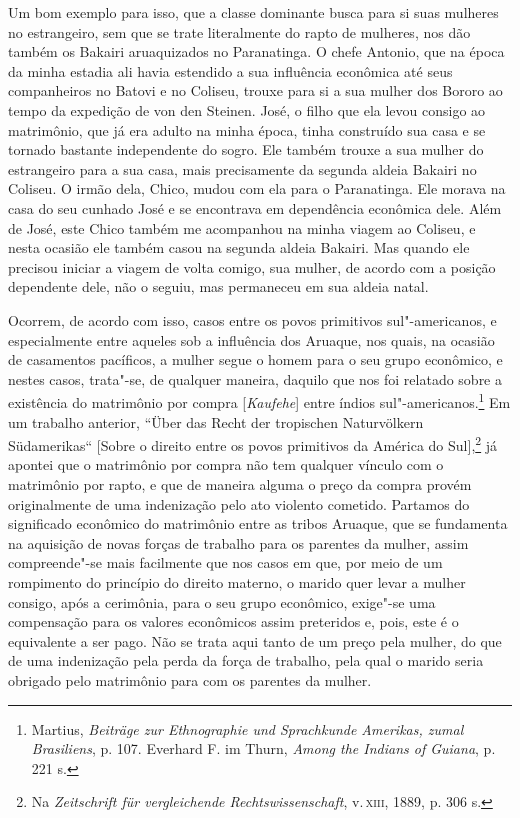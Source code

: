 Um bom exemplo para isso, que a classe dominante busca para si suas
mulheres no estrangeiro, sem que se trate literalmente do rapto de
mulheres, nos dão também os Bakairi aruaquizados no Paranatinga. O
chefe Antonio, que na época da minha estadia ali havia estendido a sua
influência econômica até seus companheiros no Batovi e no Coliseu,
trouxe para si a sua mulher dos Bororo ao tempo da expedição de von den
Steinen. José, o filho que ela levou consigo ao matrimônio, que já era
adulto na minha época, tinha construído sua casa e se tornado bastante
independente do sogro. Ele também trouxe a sua mulher do estrangeiro
para a sua casa, mais precisamente da segunda aldeia Bakairi no Coliseu.
O irmão dela, Chico, mudou com ela para o Paranatinga. Ele morava na
casa do seu cunhado José e se encontrava em dependência econômica dele.
Além de José, este Chico também me acompanhou na minha viagem ao
Coliseu, e nesta ocasião ele também casou na segunda aldeia Bakairi. Mas
quando ele precisou iniciar a viagem de volta comigo, sua mulher, de
acordo com a posição dependente dele, não o seguiu, mas permaneceu em
sua aldeia natal.

Ocorrem, de acordo com isso, casos entre os povos primitivos
sul"-americanos, e especialmente entre aqueles sob a influência dos
Aruaque, nos quais, na ocasião de casamentos pacíficos, a mulher segue
o homem para o seu grupo econômico, e nestes casos, trata"-se, de
qualquer maneira, daquilo que nos foi relatado sobre a existência do
matrimônio por compra {[}\emph{Kaufehe}{]} entre índios
sul"-americanos.\footnote{Martius, \emph{Beiträge zur Ethnographie und
  Sprachkunde Amerikas, zumal Brasiliens}, p. 107. Everhard F. im
  Thurn, \emph{Among the Indians of Guiana}, p. 221 s.} Em um trabalho
anterior, ``Über das Recht der tropischen Naturvölkern Südamerikas``
{[}Sobre o direito entre os povos primitivos da América do
Sul{]},\footnote{Na \emph{Zeitschrift für vergleichende
  Rechtswissenschaft}, v.\,\textsc{xiii}, 1889, p. 306 s.} já apontei que o
matrimônio por compra não tem qualquer vínculo com o matrimônio por
rapto, e que de maneira alguma o preço da compra provém originalmente de
uma indenização pelo ato violento cometido. Partamos do significado
econômico do matrimônio entre as tribos Aruaque, que se fundamenta na
aquisição de novas forças de trabalho para os parentes da mulher, assim
compreende"-se mais facilmente que nos casos em que, por meio de um
rompimento do princípio do direito materno, o marido quer levar a mulher
consigo, após a cerimônia, para o seu grupo econômico, exige"-se uma
compensação para os valores econômicos assim preteridos e, pois, este é
o equivalente a ser pago. Não se trata aqui tanto de um preço pela
mulher, do que de uma indenização pela perda da força de trabalho, pela
qual o marido seria obrigado pelo matrimônio para com os parentes da
mulher.

